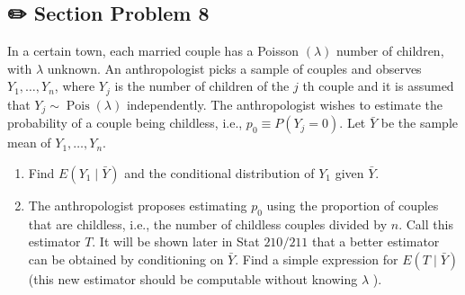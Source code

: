 \documentclass[
  letterpaper,
  DIV=11,
  numbers=noendperiod]{scrreprt}
\theoremstyle{definition}
\theoremstyle{plain}
\theoremstyle{remark}
\begin{document}
\hypertarget{section-problem-8}{%
\subsection*{✏️ Section Problem 8}\label{section-problem-8}}

In a certain town, each married couple has a Poisson \((\lambda)\)
number of children, with \(\lambda\) unknown. An anthropologist picks a
sample of couples and observes \(Y_1, \ldots, Y_n\), where \(Y_j\) is
the number of children of the \(j\) th couple and it is assumed that
\(Y_j \sim \operatorname{Pois}(\lambda)\) independently. The
anthropologist wishes to estimate the probability of a couple being
childless, i.e., \(p_0 \equiv P\left(Y_j=0\right)\). Let \(\bar{Y}\) be
the sample mean of \(Y_1, \ldots, Y_n\).

\begin{enumerate}
\def\labelenumi{(\alph{enumi})}
\item
  Find \(E\left(Y_1 \mid \bar{Y}\right)\) and the conditional
  distribution of \(Y_1\) given \(\bar{Y}\).
\item
  The anthropologist proposes estimating \(p_0\) using the proportion of
  couples that are childless, i.e., the number of childless couples
  divided by \(n\). Call this estimator \(T\). It will be shown later in
  Stat \(210 / 211\) that a better estimator can be obtained by
  conditioning on \(\bar{Y}\). Find a simple expression for
  \(E(T \mid \bar{Y})\) (this new estimator should be computable without
  knowing \(\lambda\) ).
\end{enumerate}
\end{document}
